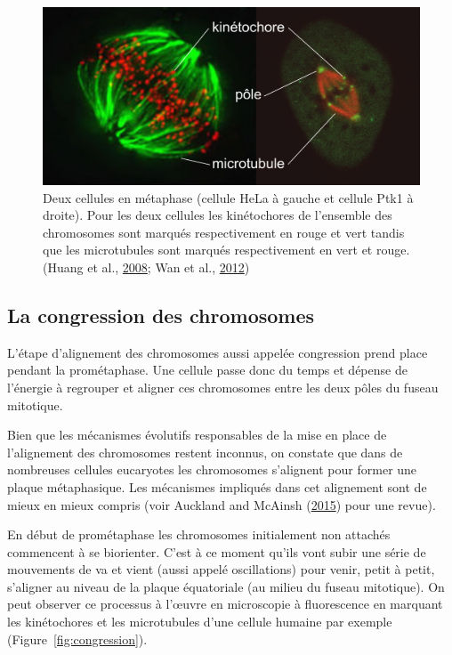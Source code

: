 \documentclass[12pt,a4paper,twoside,openright]{book}
\begin{document}
\begin{figure}[htbp]
\centering
\includegraphics{figures/intro/spindle_micro.png}
\caption[Deux types de cellules différentes en métaphase]{\label{fig:spindle_micro}Deux
cellules en métaphase (cellule HeLa à gauche et cellule Ptk1 à droite).
Pour les deux cellules les kinétochores de l'ensemble des chromosomes
sont marqués respectivement en rouge et vert tandis que les microtubules
sont marqués respectivement en vert et rouge. (Huang et al.,
\hyperref[ref-Huang2008]{2008}; Wan et al.,
\hyperref[ref-Wan2012]{2012})}
\end{figure}

\subsection{La congression des
chromosomes}\label{la-congression-des-chromosomes}

L'étape d'alignement des chromosomes aussi appelée congression prend
place pendant la prométaphase. Une cellule passe donc du temps et
dépense de l'énergie à regrouper et aligner ces chromosomes entre les
deux pôles du fuseau mitotique.

Bien que les mécanismes évolutifs responsables de la mise en place de
l'alignement des chromosomes restent inconnus, on constate que dans de
nombreuses cellules eucaryotes les chromosomes s'alignent pour former
une plaque métaphasique. Les mécanismes impliqués dans cet alignement
sont de mieux en mieux compris (voir Auckland and McAinsh
(\hyperref[ref-Auckland2015a]{2015}) pour une revue).

En début de prométaphase les chromosomes initialement non attachés
commencent à se biorienter. C'est à ce moment qu'ils vont subir une
série de mouvements de va et vient (aussi appelé oscillations) pour
venir, petit à petit, s'aligner au niveau de la plaque équatoriale (au
milieu du fuseau mitotique). On peut observer ce processus à l'œuvre en
microscopie à fluorescence en marquant les kinétochores et les
microtubules d'une cellule humaine par exemple
(Figure~\ref{fig:congression}).
\end{document}
